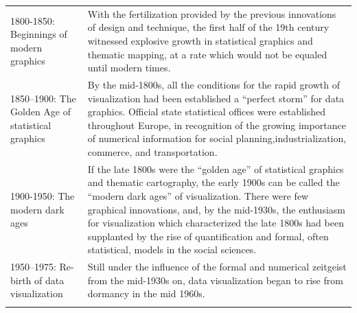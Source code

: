 \documentclass[]{book}
\theoremstyle{definition}
\theoremstyle{definition}
\theoremstyle{definition}
\theoremstyle{remark}
\begin{document}
\begin{longtable}[]{@{}ll@{}}
\begin{minipage}[t]{0.16\columnwidth}
1800-1850: Beginnings of modern graphics\strut
\end{minipage} & \begin{minipage}[t]{0.78\columnwidth}\raggedright\strut
With the fertilization provided by the previous innovations of design
and technique, the first half of the 19th century witnessed explosive
growth in statistical graphics and thematic mapping, at a rate which
would not be equaled until modern times.\strut
\end{minipage}\tabularnewline
\begin{minipage}[t]{0.16\columnwidth}\raggedright\strut
1850--1900: The Golden Age of statistical graphics\strut
\end{minipage} & \begin{minipage}[t]{0.78\columnwidth}\raggedright\strut
By the mid-1800s, all the conditions for the rapid growth of
visualization had been established a ``perfect storm'' for data
graphics. Official state statistical offices were established throughout
Europe, in recognition of the growing importance of numerical
information for social planning,industrialization, commerce, and
transportation.\strut
\end{minipage}\tabularnewline
\begin{minipage}[t]{0.16\columnwidth}\raggedright\strut
1900-1950: The modern dark ages\strut
\end{minipage} & \begin{minipage}[t]{0.78\columnwidth}\raggedright\strut
If the late 1800s were the ``golden age'' of statistical graphics and
thematic cartography, the early 1900s can be called the ``modern dark
ages'' of visualization. There were few graphical innovations, and, by
the mid-1930s, the enthusiasm for visualization which characterized the
late 1800s had been supplanted by the rise of quantification and formal,
often statistical, models in the social sciences.\strut
\end{minipage}\tabularnewline
\begin{minipage}[t]{0.16\columnwidth}\raggedright\strut
1950--1975: Re-birth of data visualization\strut
\end{minipage} & \begin{minipage}[t]{0.78\columnwidth}\raggedright\strut
Still under the influence of the formal and numerical zeitgeist from the
mid-1930s on, data visualization began to rise from dormancy in the mid
1960s.\strut
\end{minipage}\tabularnewline
\begin{minipage}[t]{0.16\columnwidth}\raggedright\strut

\end{minipage}
\end{longtable}
\end{document}
